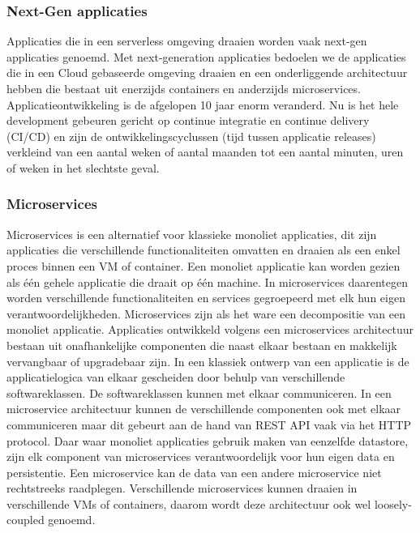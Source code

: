 \subsubsection{Next-Gen applicaties}
Applicaties die in een serverless omgeving draaien worden vaak next-gen applicaties genoemd. Met next-generation applicaties bedoelen we de applicaties die in een Cloud gebaseerde omgeving draaien en een onderliggende architectuur hebben die bestaat uit enerzijds containers en anderzijds microservices. Applicatieontwikkeling is de afgelopen 10 jaar enorm veranderd. Nu is het hele development gebeuren gericht op continue integratie en continue delivery (CI/CD) en zijn de ontwikkelingscyclussen (tijd tussen applicatie releases) verkleind van een aantal weken of aantal maanden tot een aantal minuten, uren of weken in het slechtste geval. 

\subsubsection{Microservices}
Microservices is een alternatief voor klassieke monoliet applicaties, dit zijn applicaties die verschillende functionaliteiten omvatten en draaien als een enkel proces binnen een VM of container. Een monoliet applicatie kan worden gezien als één gehele applicatie die draait op één machine.  In microservices daarentegen worden verschillende functionaliteiten en services gegroepeerd met elk hun eigen verantwoordelijkheden. Microservices zijn als het ware  een decompositie van een monoliet applicatie. Applicaties ontwikkeld volgens een microservices architectuur bestaan uit onafhankelijke componenten die naast elkaar bestaan en makkelijk vervangbaar of upgradebaar zijn. In een klassiek ontwerp van een applicatie is de applicatielogica van elkaar gescheiden door behulp van verschillende softwareklassen. De softwareklassen kunnen met elkaar communiceren. In een microservice architectuur kunnen de verschillende componenten ook met elkaar communiceren maar dit gebeurt aan de hand van REST API vaak via het HTTP protocol. Daar waar monoliet applicaties gebruik maken van eenzelfde datastore, zijn elk component van microservices verantwoordelijk voor hun eigen data en persistentie. Een microservice kan de data van een andere microservice niet rechtstreeks raadplegen. Verschillende microservices kunnen draaien in verschillende VMs of containers, daarom wordt deze architectuur ook wel loosely-coupled genoemd.\autocite{Fowler2014}

